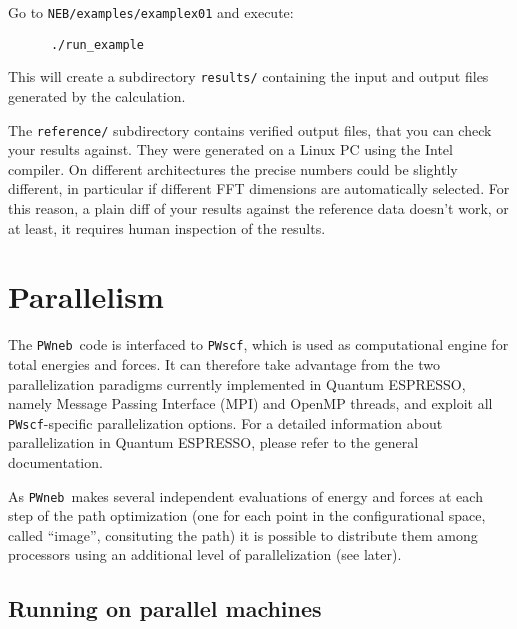 \documentclass[12pt,a4paper]{article}
\def\qe{{\sc Quantum ESPRESSO}}
\def\NEB{\texttt{PWneb}} %
\def\PWscf{\texttt{PWscf}}
\begin{document}
Go to \texttt{NEB/examples/examplex01} and execute:
\begin{verbatim}
      ./run_example
\end{verbatim}
This will create a subdirectory \texttt{results/} containing the input and
output files generated by the calculation.

The \texttt{reference/} subdirectory contains
verified output files, that you can check your results against. They
were generated on a Linux PC using the Intel compiler. On different
architectures the precise numbers could be slightly different, in
particular if different FFT dimensions are automatically selected. For
this reason, a plain diff of your results against the reference data
doesn't work, or at least, it requires human inspection of the
results. 

\section{Parallelism}
\label{Sec:para}

The \NEB\ code is interfaced to \PWscf, which is used as computational engine 
for total energies and forces. It can therefore take advantage from the two 
parallelization paradigms currently implemented in \qe, namely
  Message Passing Interface (MPI) and OpenMP threads, and exploit
all \PWscf-specific parallelization options.
For a detailed information about parallelization in \qe, 
please refer to the general documentation.

As \NEB \ makes several independent evaluations of energy and forces at each step of
the path optimization (one for each point in the configurational space,
 called ``image'', consituting the path)
 it is possible to distribute them among processors using an additional level of 
parallelization (see later).

\subsection{Running on parallel machines}
\label{SubSec:para}
\end{document}
